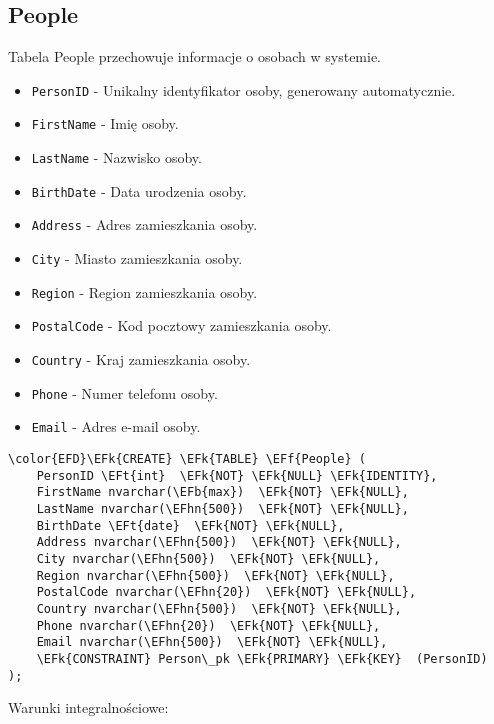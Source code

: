 \documentclass[11pt]{article}
\newcommand{\EFk}[1]{\textcolor{EFk}{\textbf{#1}}} %
\newcommand{\EFb}[1]{\textcolor{EFb}{\textbf{#1}}} %
\newcommand{\EFf}[1]{\textcolor{EFf}{#1}} %
\newcommand{\EFt}[1]{\textcolor{EFt}{\textbf{#1}}} %
\newcommand{\EFhn}[1]{\textcolor{EFhn}{#1}} %
\begin{document}
\subsection{People}
\label{sec:orge9b6ab2}
Tabela People przechowuje informacje o osobach w systemie.
\begin{itemize}
\item \texttt{PersonID} - Unikalny identyfikator osoby, generowany automatycznie.
\item \texttt{FirstName} - Imię osoby.
\item \texttt{LastName} - Nazwisko osoby.
\item \texttt{BirthDate} - Data urodzenia osoby.
\item \texttt{Address} - Adres zamieszkania osoby.
\item \texttt{City} - Miasto zamieszkania osoby.
\item \texttt{Region} - Region zamieszkania osoby.
\item \texttt{PostalCode} - Kod pocztowy zamieszkania osoby.
\item \texttt{Country} - Kraj zamieszkania osoby.
\item \texttt{Phone} - Numer telefonu osoby.
\item \texttt{Email} - Adres e-mail osoby.
\end{itemize}
\begin{Code}
\begin{Verbatim}
\color{EFD}\EFk{CREATE} \EFk{TABLE} \EFf{People} (
    PersonID \EFt{int}  \EFk{NOT} \EFk{NULL} \EFk{IDENTITY},
    FirstName nvarchar(\EFb{max})  \EFk{NOT} \EFk{NULL},
    LastName nvarchar(\EFhn{500})  \EFk{NOT} \EFk{NULL},
    BirthDate \EFt{date}  \EFk{NOT} \EFk{NULL},
    Address nvarchar(\EFhn{500})  \EFk{NOT} \EFk{NULL},
    City nvarchar(\EFhn{500})  \EFk{NOT} \EFk{NULL},
    Region nvarchar(\EFhn{500})  \EFk{NOT} \EFk{NULL},
    PostalCode nvarchar(\EFhn{20})  \EFk{NOT} \EFk{NULL},
    Country nvarchar(\EFhn{500})  \EFk{NOT} \EFk{NULL},
    Phone nvarchar(\EFhn{20})  \EFk{NOT} \EFk{NULL},
    Email nvarchar(\EFhn{500})  \EFk{NOT} \EFk{NULL},
    \EFk{CONSTRAINT} Person\_pk \EFk{PRIMARY} \EFk{KEY}  (PersonID)
);
\end{Verbatim}
\end{Code}
Warunki integralnościowe:
\end{document}
